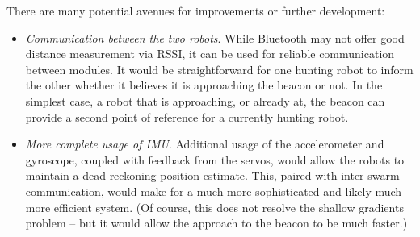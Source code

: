 \documentclass[]{article}
\providecommand{\tightlist}{%
  \setlength{\itemsep}{0pt}\setlength{\parskip}{0pt}}
\begin{document}
There are many potential avenues for improvements or further
development:

\begin{itemize}
\tightlist
\item
  \emph{Communication between the two robots}. While Bluetooth may not offer good distance measurement via RSSI, it can be used for reliable  communication between modules.
  It would be straightforward for one hunting robot to inform the other whether it believes it is approaching the beacon or not.
  In the simplest case, a robot that is approaching, or already at, the beacon can provide a second point of reference for a currently hunting robot.
\item
  \emph{More complete usage of IMU}. Additional usage of the accelerometer and gyroscope, coupled with feedback from the servos, would allow the robots to maintain a dead-reckoning position estimate.
  This, paired with inter-swarm communication, would make for a much more sophisticated and likely much more efficient system.
  (Of course, this does not resolve the shallow gradients problem -- but it would allow the approach to the beacon to be much faster.)
\end{itemize}

{}

\end{document}
